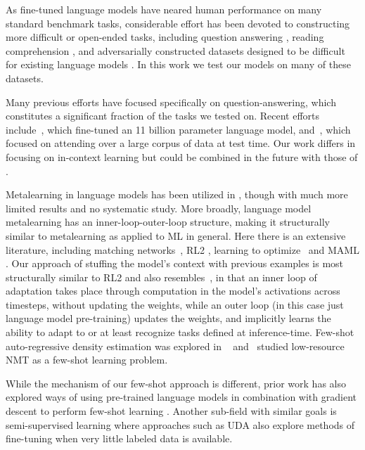 As fine-tuned language models have neared human performance on many standard benchmark tasks, considerable effort has been devoted to constructing more difficult or open-ended tasks, including question answering \cite{Kwiatkowski2019nq,Iyyer2014quiz, Clark2018ThinkYH,Mihaylov2018CanAS}, reading comprehension \cite{choi2018quac,reddy2019coqa}, and adversarially constructed datasets designed to be difficult for existing language models \cite{sakaguchi2019winogrande,nie2019adversarial}.  In this work we test our models on many of these datasets.

Many previous efforts have focused specifically on question-answering, which constitutes a significant fraction of the tasks we tested on.  Recent efforts include~\citep{raffel2019t5, roberts2020much}, which fine-tuned an 11 billion parameter language model, and~\cite{guu2020realm}, which focused on attending over a large corpus of data at test time.  Our work differs in focusing on in-context learning but could be combined in the future with those of \cite{guu2020realm,lewis2020retrieval}.


Metalearning in language models has been utilized in \cite{radford2019language}, though with much more limited results and no systematic study.  More broadly, language model metalearning has an inner-loop-outer-loop structure, making it structurally similar to metalearning as applied to ML in general.  Here there is an extensive literature, including matching networks~\citep{vinyals2016matching}, RL2 \cite{Duan2016RL2FR},  learning to optimize~\citep{ravi2016optimization, andrychowicz2016learning, li2017learning} and MAML \cite{Finn2017ModelAgnosticMF}.  Our approach of stuffing the model’s context with previous examples is most structurally similar to RL2 and also resembles~\cite{hochreiter2001learning}, in that an inner loop of adaptation takes place through computation in the model’s activations across timesteps, without updating the weights, while an outer loop (in this case just language model pre-training) updates the weights, and implicitly learns the ability to adapt to or at least recognize tasks defined at inference-time. Few-shot auto-regressive density estimation was explored in ~\cite{reed2017few} and~\cite{gu2018meta} studied low-resource NMT as a few-shot learning problem.

While the mechanism of our few-shot approach is different, prior work has also explored ways of using pre-trained language models in combination with gradient descent to perform few-shot learning \cite{schick2020exploiting}. Another sub-field with similar goals is semi-supervised learning where approaches such as UDA \cite{xie2019unsupervised} also explore methods of fine-tuning when very little labeled data is available.

